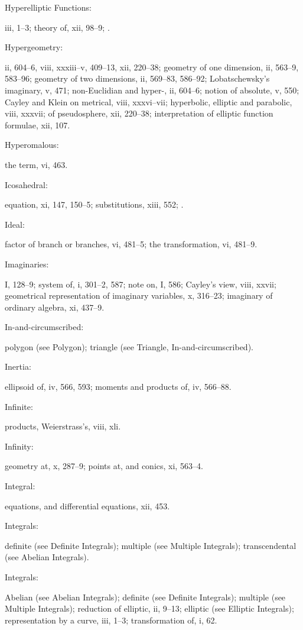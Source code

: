 \documentclass[11pt,a4paper]{book}
\providecommand{\V}[1]{#1}
\providecommand{\IndexEntry}[2]{#1\dotfill #2\par}
\begin{document}
\IndexEntry{Hyperelliptic Functions}: \V{iii}, 1--3; theory of, \V{xii}, 98--9; .

\IndexEntry{Hypergeometry}: \V{ii}, 604--6, \V{viii}, xxxiii--v, 409--13, \V{xii}, 220--38; geometry of one dimension, \V{ii}, 563--9, 583--96; geometry of two dimensions, \V{ii}, 569--83, 586--92; Lobatschewsky's imaginary, \V{v}, 471; non-Euclidian and hyper-, \V{ii}, 604--6; notion of absolute, \V{v}, 550; Cayley and Klein on metrical, \V{viii}, xxxvi--vii; hyperbolic, elliptic and parabolic, \V{viii}, xxxvii; of pseudosphere, \V{xii}, 220--38; interpretation of elliptic function formulae, \V{xii}, 107.

\IndexEntry{Hyperomalous}: the term, \V{vi}, 463.

\IndexEntry{Icosahedral}: equation, \V{xi}, 147, 150--5; substitutions, \V{xiii}, 552; .

\IndexEntry{Ideal}: factor of branch or branches, \V{vi}, 481--5; the transformation, \V{vi}, 481--9.

\IndexEntry{Imaginaries}: \V{I}, 128--9; system of, \V{i}, 301--2, 587; note on, \V{I}, 586; Cayley's view, \V{viii}, xxvii; geometrical representation of imaginary variables, \V{x}, 316--23; imaginary of ordinary algebra, \V{xi}, 437--9.

\IndexEntry{In-and-circumscribed}: polygon (see Polygon); triangle (see Triangle, In-and-circumscribed).

\IndexEntry{Inertia}: ellipsoid of, \V{iv}, 566, 593; moments and products of, \V{iv}, 566--88.

\IndexEntry{Infinite}: products, Weierstrass's, \V{viii}, xli.

\IndexEntry{Infinity}: geometry at, \V{x}, 287--9; points at, and conics, \V{xi}, 563--4.

\IndexEntry{Integral}: equations, and differential equations, \V{xii}, 453.

\IndexEntry{Integrals}: definite (see Definite Integrals); multiple (see Multiple Integrals); transcendental (see Abelian Integrals).

\newpage

\setcounter{page}{105}

\IndexEntry{Integrals}: Abelian (see Abelian Integrals); definite (see Definite Integrals); multiple (see Multiple Integrals); reduction of elliptic, \V{ii}, 9--13; elliptic (see Elliptic Integrals); representation by a curve, \V{iii}, 1--3; transformation of, \V{i}, 62.
\end{document}
